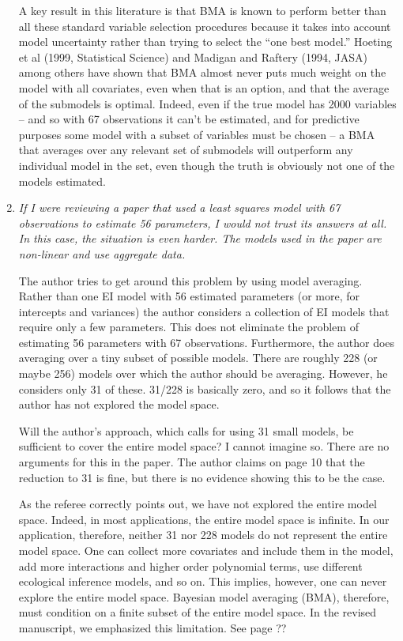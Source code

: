 \documentclass[11pt]{article}
\begin{document}
\begin{enumerate}
  A key result in this literature is that BMA is known to perform
  better than all these standard variable selection procedures because
  it takes into account model uncertainty rather than trying to select
  the ``one best model.''  Hoeting et al (1999, Statistical Science)
  and Madigan and Raftery (1994, JASA) among others have shown that
  BMA almost never puts much weight on the model with all covariates,
  even when that is an option, and that the average of the submodels
  is optimal.  Indeed, even if the true model has 2000 variables --
  and so with 67 observations it can't be estimated, and for
  predictive purposes some model with a subset of variables must be
  chosen -- a BMA that averages over any relevant set of submodels
  will outperform any individual model in the set, even though the
  truth is obviously not one of the models estimated.  
 
\item {\it If I were reviewing a paper that used a least squares model
    with 67 observations to estimate 56 parameters, I would not trust
    its answers at all.  In this case, the situation is even harder.
    The models used in the paper are non-linear and use aggregate
    data.
    
    The author tries to get around this problem by using model
    averaging.  Rather than one EI model with 56 estimated parameters
    (or more, for intercepts and variances) the author considers a
    collection of EI models that require only a few parameters.  This
    does not eliminate the problem of estimating 56 parameters with 67
    observations.  Furthermore, the author does averaging over a tiny
    subset of possible models.  There are roughly 228 (or maybe 256)
    models over which the author should be averaging.  However, he
    considers only 31 of these.  31/228 is basically zero, and so it
    follows that the author has not explored the model space. 
    
    Will the author's approach, which calls for using 31 small models,
    be sufficient to cover the entire model space?  I cannot imagine
    so.  There are no arguments for this in the paper.  The author
    claims on page 10 that the reduction to 31 is fine, but there is
    no evidence showing this to be the case.}
  
  As the referee correctly points out, we have not explored the entire
  model space. Indeed, in most applications, the entire model space is
  infinite. In our application, therefore, neither 31 nor 228 models
  do not represent the entire model space. One can collect more
  covariates and include them in the model, add more interactions and
  higher order polynomial terms, use different ecological inference
  models, and so on.  This implies, however, one can never explore the
  entire model space.  Bayesian model averaging (BMA), therefore, must
  condition on a finite subset of the entire model space. In the
  revised manuscript, we emphasized this limitation. See page ??
  

\end{enumerate}
\end{document}
